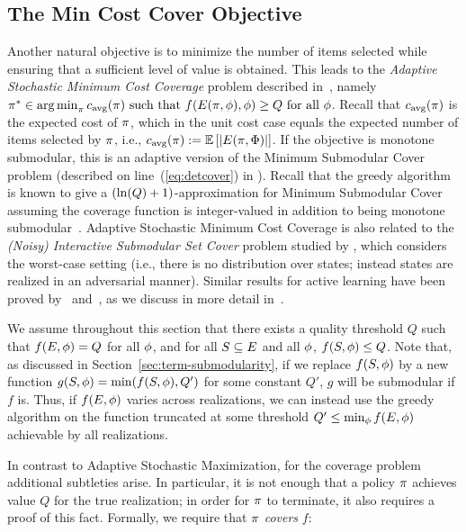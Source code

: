 \subsection{The Min Cost Cover Objective} \label{sec:min-cost-cover}
%
Another natural objective is to minimize the number of items selected
while ensuring that a sufficient level of value is obtained.  This
leads to the \emph{Adaptive Stochastic Minimum Cost Coverage} problem
described in~, namely  
$\pi^{*}\in\mathop{\rm arg\,min}_{\pi} {c_{\text{avg}}{(\pi)}}\text{ such that }
f(E({\pi}, {{\color{black}{\ensuremath{\phi}}}}),{\color{black}{\ensuremath{\phi}}})\geq Q\text{ for all }{\color{black}{\ensuremath{\phi}}}$.  Recall that 
${c_{\text{avg}}{(\pi)}}$ is the expected cost of $\pi$, which in the unit
cost case equals the expected number of items
selected by $\pi$, i.e., ${c_{\text{avg}}{(\pi)}}:=\mathbb{E}\left[|E({\pi}, {{\color{black}{\ensuremath{\Phi}}}})|\right]$.
%
If the objective is \term monotone submodular, 
this is an adaptive version of the Minimum Submodular Cover problem
(described on line~(\ref{eq:detcover}) in
).  Recall that the greedy algorithm is known to give a
$(\ln(Q)+1)$-approximation for Minimum Submodular Cover
assuming the coverage function is integer-valued in addition to being monotone submodular~\citep{wolsey82}. 
Adaptive Stochastic Minimum Cost Coverage is also related
to the \emph{(Noisy) Interactive Submodular Set Cover} problem studied by
\citet{guillory10interactive,guillory2011-noisy-interactive-submod-cover}, 
which considers the worst-case setting
(i.e., there is no distribution over states; instead states are
realized in an adversarial manner). 
Similar results for active learning have been proved
by~\citet{kosaraju99} and~\citet{dasgupta04}, as we discuss in more detail in~.

We assume throughout this section that there exists a quality
threshold $Q$ such that $f(E, {\color{black}{\ensuremath{\phi}}}) = Q$ for all ${\color{black}{\ensuremath{\phi}}}$, and
for all $S \subseteq E$ and all ${\color{black}{\ensuremath{\phi}}}$, $f(S, {\color{black}{\ensuremath{\phi}}}) \le Q$. Note that, as discussed in Section~\ref{sec:term-submodularity}, if we replace $f(S,{\color{black}{\ensuremath{\phi}}})$ by a new function $g(S,{\color{black}{\ensuremath{\phi}}})=\min(f(S,{\color{black}{\ensuremath{\phi}}}),Q')$ for some constant $Q'$, $g$ will be \term submodular if $f$ is. Thus, if $f(E,{\color{black}{\ensuremath{\phi}}})$ varies across realizations, we can instead use the greedy algorithm on the function truncated at some threshold $Q'\leq \min_{{\color{black}{\ensuremath{\phi}}}}f(E,{\color{black}{\ensuremath{\phi}}})$ achievable by all realizations.


In contrast to Adaptive Stochastic Maximization, for the coverage
problem additional subtleties arise. 
In particular,  it is not enough 
that a policy $\pi$ achieves value $Q$ for the true realization; 
in order for $\pi$ to terminate, it also requires a proof of this
fact.  Formally, we require that $\pi$ \emph{covers} $f$:

